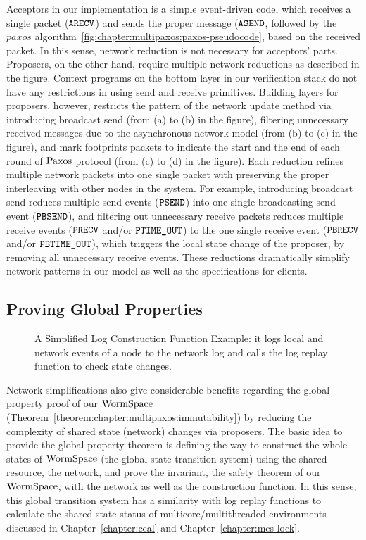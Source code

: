 Acceptors in our implementation is a simple event-driven code, which receives a single packet (${\mathrm{\texttt{ARECV}}}$) and 
sends the proper message (${\mathrm{\texttt{ASEND}}}$, followed by the $paxos$ algorithm~\ref{fig:chapter:multipaxos:paxos-pseudocode}, 
based on the received packet.
In this sense, 
network reduction is not necessary for acceptors' parts. 
Proposers, on the other hand, require multiple network reductions as described in the figure. 
Context programs on the bottom layer in our verification stack do not have any restrictions in using send and receive primitives.
Building layers for proposers,  however, 
restricts the pattern of the network update method 
via introducing broadcast send (from (a) to (b) in the figure), 
filtering unnecessary received messages due to the asynchronous  network model (from (b) to (c) in the figure),
and mark footprints packets to indicate the start and the end of each round of $\mathrm{Paxos}$ protocol (from (c) to (d) in the figure).
Each reduction refines multiple network packets into one single packet with preserving the proper interleaving with other nodes in the system. 
For example, 
introducing broadcast send reduces multiple send events (${\mathrm{\texttt{PSEND}}}$) into one single broadcasting send event (${\mathrm{\texttt{PBSEND}}}$),
and filtering out unnecessary receive packets reduces multiple receive events (${\mathrm{\texttt{PRECV}}}$ and/or ${\mathrm{\texttt{PTIME\_OUT}}}$) 
to the one single receive event (${\mathrm{\texttt{PBRECV}}}$ and/or ${\mathrm{\texttt{PBTIME\_OUT}}}$), which triggers the local state change of the proposer,
by removing all unnecessary receive events. 
These reductions dramatically simplify network patterns in our model as well as the specifications for clients. 


\subsection{Proving Global Properties}
\label{subsec:safety_verification}

\begin{figure}

\caption{A Simplified Log Construction Function Example: it logs local and network events of a node to the network log and calls the log replay function to check state changes.}
\label{fig:chapter:multipaxos:spec}
\end{figure}


Network simplifications also give considerable benefits regarding the global property proof of our $\mathrm{WormSpace}$ (Theorem~\ref{theorem:chapter:multipaxos:immutability}) by reducing the complexity of 
shared state (network) changes via proposers.
The basic idea to provide the global property theorem is defining the way to construct the whole states of $\mathrm{WormSpace}$ (the global state transition system) using the shared resource, the network, and prove the invariant, the safety theorem of our $\mathrm{WormSpace}$, with the network as well as the construction function.  
In this sense, this global transition system has a similarity with log replay functions to calculate the shared state status of 
multicore/multithreaded environments discussed in Chapter~\ref{chapter:ccal} and Chapter~\ref{chapter:mcs-lock}.

